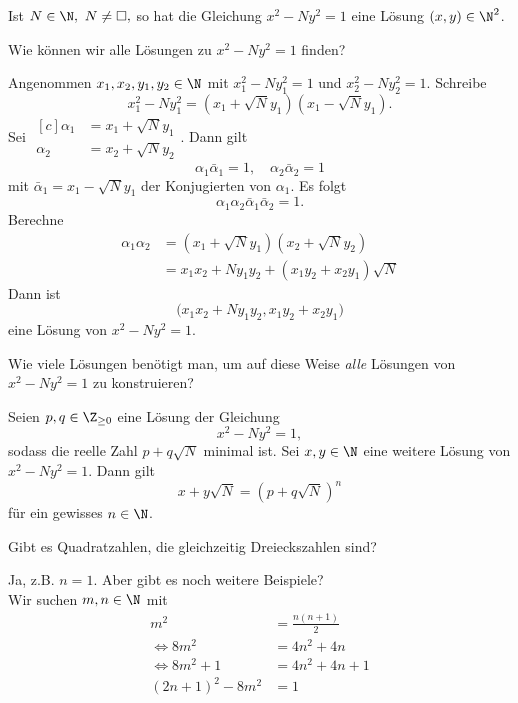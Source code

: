 \begin{cor}\autolabel
	Ist $N \in \N,\ N \neq \square,$ so hat die Gleichung $x^2-Ny^2=1$ eine Lösung $(x,y) \in \N^2$.
\end{cor}

\begin{frage*}
	Wie können wir alle Lösungen zu $x^2-Ny^2=1$ finden?
\end{frage*}

Angenommen $x_1,x_2,y_1,y_2 \in \N$ mit $x_1^2-Ny_1^2=1$ und $x_2^2-Ny_2^2=1$. Schreibe
\[ x_1^2-Ny_1^2 = (x_1+\sqrt{N}y_1)(x_1 - \sqrt{N}y_1). \]
Sei $\begin{aligned}[c]
	\alpha_1 &= x_1 + \sqrt{N}y_1\\\alpha_2 &= x_2 + \sqrt{N}y_2
\end{aligned}$. Dann gilt
\[ \alpha_1 \bar{\alpha}_1 = 1,\quad \alpha_2 \bar{\alpha}_2 = 1 \]
mit $\bar{\alpha}_1 = x_1 - \sqrt{N}y_1$ der Konjugierten von $\alpha_1$. Es folgt
\[ \alpha_1 \alpha_2 \bar{\alpha}_1 \bar{\alpha}_2 = 1. \]
Berechne
\begin{align*}
	\alpha_1 \alpha_2 &= (x_1 + \sqrt{N}y_1) (x_2 + \sqrt{N}y_2)\\
	&= x_1x_2+Ny_1y_2 + (x_1y_2+x_2y_1)\sqrt{N}
\end{align*}
Dann ist
\[ \big( x_1x_2 + Ny_1y_2, x_1y_2+x_2y_1 \big) \]
eine Lösung von $x^2-Ny^2=1$.

\begin{frage*}
	Wie viele Lösungen benötigt man, um auf diese Weise \emph{alle} Lösungen von $x^2-Ny^2=1$ zu konstruieren?
\end{frage*}

\begin{thm}\autolabel
	Seien $p,q \in \Z_{\geq 0}$ eine Lösung der Gleichung
	\[ x^2-Ny^2=1, \]
	sodass die reelle Zahl $p+q\sqrt{N}$ minimal ist. Sei $x,y \in \N$ eine weitere Lösung von $x^2-Ny^2=1$. Dann gilt
	\[ x+y\sqrt{N} = \left( p+q\sqrt{N} \right)^n \]
	für ein gewisses $n \in \N$.
\end{thm}

\begin{frage*}
	Gibt es Quadratzahlen, die gleichzeitig Dreieckszahlen sind?
\end{frage*}

Ja, z.B. $n=1$. Aber gibt es noch weitere Beispiele?\\
Wir suchen $m,n \in \N$ mit 
\begin{align*}
	m^2 &= \frac{n(n+1)}{2}\\
	\iff 8m^2 &= 4n^2+4n\\
	\iff 8m^2+1 &= 4n^2+4n+1\\
	(2n+1)^2 -8m^2 &= 1
\end{align*}

